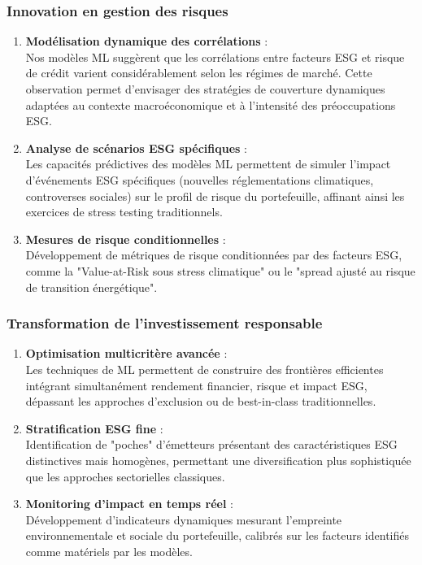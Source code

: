 \subsubsection{Innovation en gestion des risques}

\begin{enumerate}
  \item \textbf{Modélisation dynamique des corrélations} :\\
  Nos modèles ML suggèrent que les corrélations entre facteurs ESG et risque de crédit varient considérablement selon les régimes de marché. Cette observation permet d'envisager des stratégies de couverture dynamiques adaptées au contexte macroéconomique et à l'intensité des préoccupations ESG.

  \item \textbf{Analyse de scénarios ESG spécifiques} :\\
  Les capacités prédictives des modèles ML permettent de simuler l'impact d'événements ESG spécifiques (nouvelles réglementations climatiques, controverses sociales) sur le profil de risque du portefeuille, affinant ainsi les exercices de stress testing traditionnels.

  \item \textbf{Mesures de risque conditionnelles} :\\
  Développement de métriques de risque conditionnées par des facteurs ESG, comme la "Value-at-Risk sous stress climatique" ou le "spread ajusté au risque de transition énergétique".
\end{enumerate}

\subsubsection{Transformation de l'investissement responsable}

\begin{enumerate}
  \item \textbf{Optimisation multicritère avancée} :\\
  Les techniques de ML permettent de construire des frontières efficientes intégrant simultanément rendement financier, risque et impact ESG, dépassant les approches d'exclusion ou de best-in-class traditionnelles.

  \item \textbf{Stratification ESG fine} :\\
  Identification de "poches" d'émetteurs présentant des caractéristiques ESG distinctives mais homogènes, permettant une diversification plus sophistiquée que les approches sectorielles classiques.

  \item \textbf{Monitoring d'impact en temps réel} :\\
  Développement d'indicateurs dynamiques mesurant l'empreinte environnementale et sociale du portefeuille, calibrés sur les facteurs identifiés comme matériels par les modèles.
\end{enumerate}

